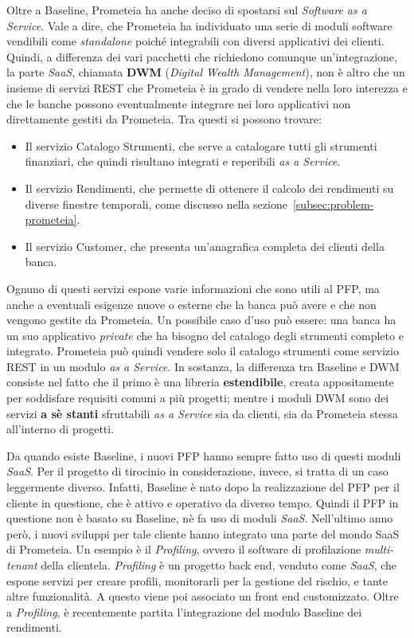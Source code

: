 Oltre a Baseline, Prometeia ha anche deciso di spostarsi sul \textit{Software as a Service}.
Vale a dire, che Prometeia ha individuato una serie di moduli software vendibili come \textit{standalone} poiché integrabili con diversi applicativi dei clienti.
Quindi, a differenza dei vari pacchetti che richiedono comunque un'integrazione, la parte \textit{SaaS}, chiamata \textbf{DWM} (\textit{Digital Wealth Management}), non è altro che un insieme di servizi REST che Prometeia è in grado di vendere nella loro interezza e che le banche possono eventualmente integrare nei loro applicativi non direttamente gestiti da Prometeia.
Tra questi si possono trovare:
\begin{itemize}
    \item Il servizio Catalogo Strumenti, che serve a catalogare tutti gli strumenti finanziari, che quindi risultano integrati e reperibili \textit{as a Service}.
    \item Il servizio Rendimenti, che permette di ottenere il calcolo dei rendimenti su diverse finestre temporali, come discusso nella sezione~\ref{subsec:problem-prometeia}.
    \item Il servizio Customer, che presenta un'anagrafica completa dei clienti della banca.
\end{itemize}
Ognuno di questi servizi espone varie informazioni che sono utili al PFP, ma anche a eventuali esigenze nuove o esterne che la banca può avere e che non vengono gestite da Prometeia.
Un possibile caso d'uso può essere:
una banca ha un suo applicativo \textit{private} che ha bisogno del catalogo degli strumenti completo e integrato.
Prometeia può quindi vendere solo il catalogo strumenti come servizio REST in un modulo \textit{as a Service}.
In sostanza, la differenza tra Baseline e DWM consiste nel fatto che il primo è una libreria \textbf{estendibile}, creata appositamente per soddisfare requisiti comuni a più progetti;
mentre i moduli DWM sono dei servizi \textbf{a sè stanti} sfruttabili \textit{as a Service} sia da clienti, sia da Prometeia stessa all'interno di progetti.

Da quando esiste Baseline, i nuovi PFP hanno sempre fatto uso di questi moduli \textit{SaaS}.
Per il progetto di tirocinio in considerazione, invece, si tratta di un caso leggermente diverso.
Infatti, Baseline è nato dopo la realizzazione del PFP per il cliente in questione, che è attivo e operativo da diverso tempo.
Quindi il PFP in questione non è basato su Baseline, nè fa uso di moduli \textit{SaaS}.
Nell'ultimo anno però, i nuovi sviluppi per tale cliente hanno integrato una parte del mondo SaaS di Prometeia.
Un esempio è il \textit{Profiling}, ovvero il software di profilazione \textit{multi-tenant} della clientela.
\textit{Profiling} è un progetto back end, venduto come \textit{SaaS}, che espone servizi per creare profili, monitorarli per la gestione del rischio, e tante altre funzionalità.
A questo viene poi associato un front end customizzato.
Oltre a \textit{Profiling}, è recentemente partita l'integrazione del modulo Baseline dei rendimenti.

